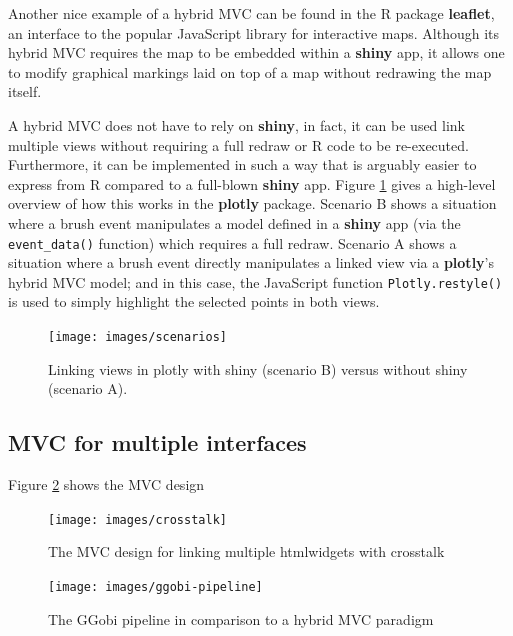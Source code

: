 \documentclass[12pt,]{isuthesis}
\begin{document}
Another nice example of a hybrid MVC can be found in the R package
\textbf{leaflet}, an interface to the popular JavaScript library for
interactive maps. Although its hybrid MVC requires the map to be
embedded within a \textbf{shiny} app, it allows one to modify graphical
markings laid on top of a map without redrawing the map itself.

A hybrid MVC does not have to rely on \textbf{shiny}, in fact, it can be
used link multiple views without requiring a full redraw or R code to be
re-executed. Furthermore, it can be implemented in such a way that is
arguably easier to express from R compared to a full-blown
\textbf{shiny} app. Figure \ref{fig:scenarios} gives a high-level
overview of how this works in the \textbf{plotly} package. Scenario B
shows a situation where a brush event manipulates a model defined in a
\textbf{shiny} app (via the \texttt{event\_data()} function) which
requires a full redraw. Scenario A shows a situation where a brush event
directly manipulates a linked view via a \textbf{plotly}'s hybrid MVC
model; and in this case, the JavaScript function
\texttt{Plotly.restyle()} is used to simply highlight the selected
points in both views.

\begin{figure}[htbp]
\centering
\texttt{[image: images/scenarios]}
\caption{\label{fig:scenarios}Linking views in plotly with shiny (scenario
B) versus without shiny (scenario A).}
\end{figure}

\subsection{MVC for multiple
interfaces}\label{mvc-for-multiple-interfaces}

Figure \ref{fig:crosstalk} shows the MVC design

\begin{figure}[htbp]
\centering
\texttt{[image: images/crosstalk]}
\caption{\label{fig:crosstalk}The MVC design for linking multiple
htmlwidgets with crosstalk}
\end{figure}

\begin{figure}[htbp]
\centering
\texttt{[image: images/ggobi-pipeline]}
\caption{\label{fig:hybrid-pipeline}The GGobi pipeline in comparison to a
hybrid MVC paradigm}
\end{figure}
\end{document}

